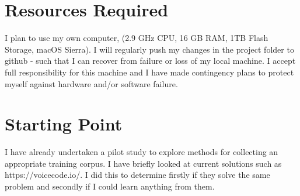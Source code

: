\documentclass[12pt]{article}
\begin{document}
\section*{Resources Required}

I plan to use my own computer, (2.9 GHz CPU, 16 GB RAM, 1TB Flash Storage, macOS Sierra). I will regularly push my changes 
in the project folder to github - such that I can recover from failure or loss of my local machine. I accept full responsibility for this machine 
and I have made contingency plans to protect myself against hardware and/or software failure.

\section*{Starting Point}

I have already undertaken a pilot study to explore methods for collecting an appropriate training corpus. I have briefly looked at current 
solutions such as https://voicecode.io/. I did this to determine firstly if they solve the same problem and secondly if I could learn anything from them. \par
\end{document}
